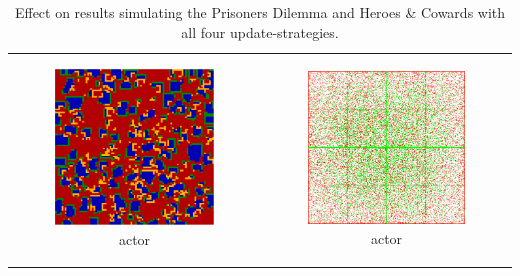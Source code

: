 \begin{table}
\begin{tabular}{c c}
		\begin{subfigure}[b]{0.4\textwidth}
			\centering
			\includegraphics[width=.7\textwidth, angle=0]{./fig/act_SG_436steps_java.png}
			\caption{actor}
			\label{fig:pd_act}
		\end{subfigure}
    	& 
		\begin{subfigure}[b]{0.4\textwidth}
			\centering
			\includegraphics[width=.7\textwidth, angle=0]{./fig/act_HAC_100_000_500steps_scala.png}
			\caption{actor}
			\label{fig:hac_act}
		\end{subfigure}

	\end{tabular}
	
	\caption{\small Effect on results simulating the Prisoners Dilemma and Heroes \& Cowards with all four update-strategies.} 
	\label{fig:results}
\end{table}

